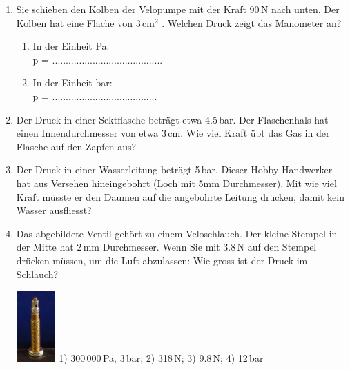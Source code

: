 \documentclass[11pt]{article}
\begin{document}
\begin{enumerate}
    \item Sie schieben den Kolben der Velopumpe mit der Kraft 90\,N nach unten. Der Kolben hat eine Fläche von 3\,cm$^2$ . Welchen Druck zeigt das Manometer an?

    \begin{enumerate}
        \item In der Einheit Pa:\\
        \vspace{0.2cm}
        p = .........................................
        \vspace{1.5cm}

        \item In der Einheit bar:\\

	       p = .......................................
        \vspace{1.5cm}

    \end{enumerate}

    \item Der Druck in einer Sektflasche beträgt etwa 4.5\,bar. Der Flaschenhals hat einen Innendurchmesser von etwa 3\,cm. Wie viel Kraft übt das Gas in der Flasche auf den Zapfen aus? \vspace{3cm}


    \item Der Druck in einer Wasserleitung beträgt 5\,bar. Dieser Hobby-Handwerker hat aus Versehen hineingebohrt (Loch mit 5mm Durchmesser). Mit wie viel Kraft müsste er den Daumen auf die angebohrte Leitung drücken, damit kein Wasser ausfliesst? \vspace{3cm}

    \item Das abgebildete Ventil gehört zu einem Veloschlauch. Der kleine Stempel in der Mitte hat 2\,mm Durchmesser. Wenn Sie mit 3.8\,N auf den Stempel drücken müssen, um die Luft abzulassen: Wie gross ist der Druck im Schlauch? %

    \includegraphics[width=1.5cm]{images/Ventil.jpg}
    \hfill {\scriptsize 1) 300\,000\,Pa, 3\,bar;  2) 318\,N;    3) 9.8\,N;      4) 12\,bar }
\end{enumerate}
\end{document}
